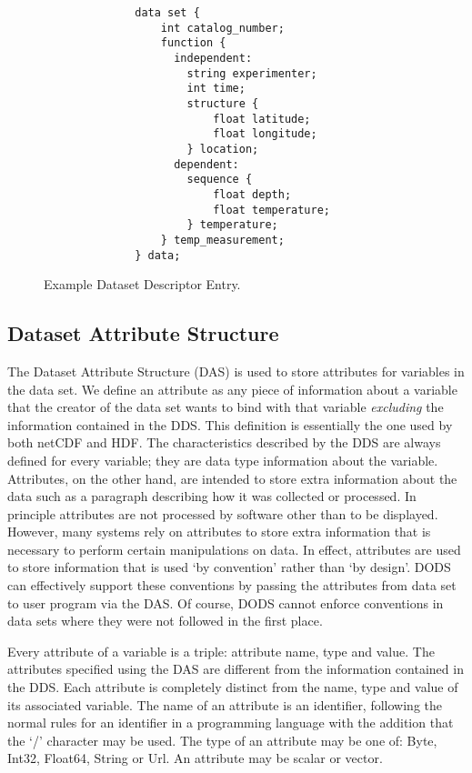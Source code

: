 \begin{figure}
\begin{center}
\begin{verbatim}
              data set {
                  int catalog_number;
                  function {
                    independent:
                      string experimenter;
                      int time;
                      structure {
                          float latitude;
                          float longitude;
                      } location;
                    dependent:
                      sequence {
                          float depth;
                          float temperature;
                      } temperature;
                  } temp_measurement;
              } data;
\end{verbatim}
\end{center}
\caption{Example Dataset Descriptor Entry.}
\label{fig:dds}
\end{figure}

\subsection{Dataset Attribute Structure}
\label{api:das}

The Dataset Attribute Structure (DAS) is used to store attributes for
variables in the data set. We define an attribute as any piece of information
about a variable that the creator of the data set wants to bind with that
variable {\em excluding\/} the information contained in the DDS. This
definition is essentially the one used by both netCDF\cite{rew:netcdf} and
HDF\cite{NCSA:HDF}. The characteristics described by the DDS are always
defined for every variable; they are data type information about the
variable. Attributes, on the other hand, are intended to store extra
information about the data such as a paragraph describing how it was
collected or processed. In principle attributes are not processed by software
other than to be displayed. However, many systems rely on attributes to store
extra information that is necessary to perform certain manipulations on data.
In effect, attributes are used to store information that is used `by
convention' rather than `by design'. DODS can effectively support these
conventions by passing the attributes from data set to user program via the
DAS. Of course, DODS cannot enforce conventions in data sets where they were
not followed in the first place.

Every attribute of a variable is a triple: attribute name, type and
value. The attributes specified using the DAS are different from the
information contained in the DDS. Each attribute is completely distinct from
the name, type and value of its associated variable. The name of an attribute
is an identifier, following the normal rules for an identifier in a
programming language with the addition that the `/' character may be
used. The type of an attribute may be one of: Byte, Int32, Float64, String or
Url. An attribute may be scalar or vector.

